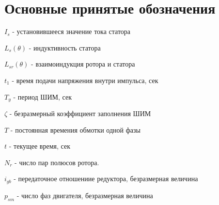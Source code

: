 \section{ Основные принятые обозначения }

$I_{s}$ - установившееся значение тока статора

$L_{s}(\theta)$ - индуктивность статора

$L_{sr}(\theta)$ - взаимоиндукция ротора и статора

$t_{1}$ - время подачи напряжения внутри импульса, сек

$T_{y}$ - период ШИМ, сек

$\zeta$ - безразмерный коэффициент заполнения ШИМ

$T$ - постоянная времения обмотки одной фазы

$t$ - текущее время, сек

$N_{r}$ - число пар полюсов ротора.

$i_{gb}$ - передаточное отношениие редуктора, безразмерная величина

$p_{sm}$ - число фаз двигателя, безразмерная величина

